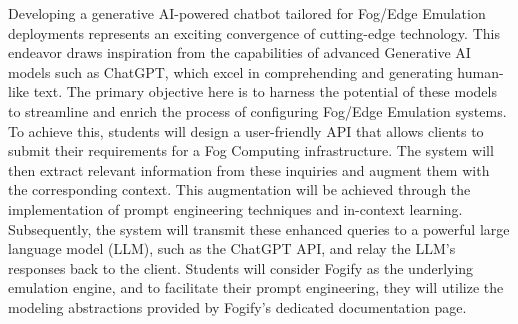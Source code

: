 Developing a generative AI-powered chatbot tailored for Fog/Edge Emulation
deployments represents an exciting convergence of cutting-edge technology. This
endeavor draws inspiration from the capabilities of advanced Generative AI
models such as ChatGPT, which excel in comprehending and generating human-like
text. The primary objective here is to harness the potential of these models to
streamline and enrich the process of configuring Fog/Edge Emulation systems. To
achieve this, students will design a user-friendly API that allows clients to
submit their requirements for a Fog Computing infrastructure. The system will
then extract relevant information from these inquiries and augment them with
the corresponding context. This augmentation will be achieved through the
implementation of prompt engineering techniques and in-context learning.
Subsequently, the system will transmit these enhanced queries to a powerful
large language model (LLM), such as the ChatGPT API, and relay the LLM's
responses back to the client. Students will consider Fogify as the underlying
emulation engine, and to facilitate their prompt engineering, they will utilize
the modeling abstractions provided by Fogify's dedicated documentation page.